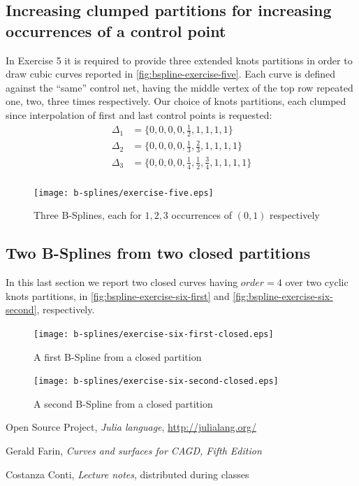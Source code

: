 \documentclass{article}
\begin{document}
\subsection{Increasing clumped partitions for increasing occurrences of a control point}
In Exercise 5 it is required to provide three extended knots partitions in
order to draw cubic curves reported in \autoref{fig:bspline-exercise-five}.
Each curve is defined against the ``same'' control net, having the middle vertex
of the top row repeated one, two, three times respectively. Our choice of knots
partitions, each clumped since interpolation of first and last control points
is requested:
\begin{displaymath}
    \begin{split}
        \Delta_{1} &= \lbrace 0,0,0,0,\frac{1}{2},1,1,1,1 \rbrace \\
        \Delta_{2} &= \lbrace 0,0,0,0,\frac{1}{3},\frac{2}{3},1,1,1,1 \rbrace \\
        \Delta_{3} &= \lbrace 0,0,0,0,\frac{1}{4},\frac{1}{2},\frac{3}{4},1,1,1,1 \rbrace \\
    \end{split}
\end{displaymath}


\begin{figure}[h!]
  \centering
  \texttt{[image: b-splines/exercise-five.eps]}
  \caption{Three B-Splines, each for $1,2,3$ occurrences of $(0,1)$ respectively }
  \label{fig:bspline-exercise-five}
\end{figure}

\subsection{Two B-Splines from two closed partitions}
In this last section we report two closed curves having $order = 4$ over
two cyclic knots partitions, in \autoref{fig:bspline-exercise-six-first}
and \autoref{fig:bspline-exercise-six-second}, respectively.

\begin{figure}[h!]
  \centering
  \texttt{[image: b-splines/exercise-six-first-closed.eps]}
  \caption{A first B-Spline from a closed partition }
  \label{fig:bspline-exercise-six-first}
\end{figure}

\begin{figure}[h!]
  \centering
  \texttt{[image: b-splines/exercise-six-second-closed.eps]}
  \caption{A second B-Spline from a closed partition }
  \label{fig:bspline-exercise-six-second}
\end{figure}

\newpage

\begin{thebibliography}{}

 Open Source Project,
  \emph{Julia language}, \url{http://julialang.org/}

 Gerald Farin,
  \textit{Curves and surfaces for CAGD, Fifth Edition}

 Costanza Conti,
    \emph{Lecture notes}, distributed during classes


\end{thebibliography}
\end{document}
